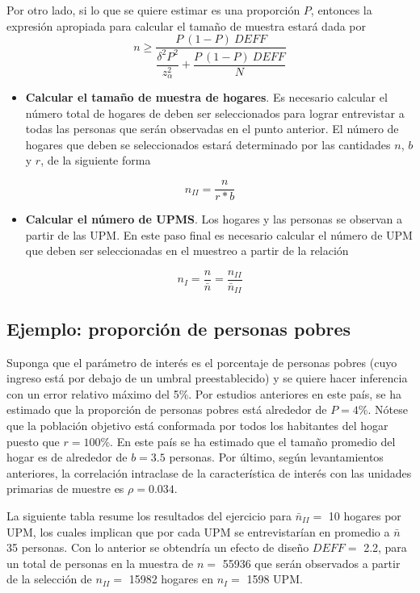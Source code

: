 Por otro lado, si lo que se quiere estimar es una proporción \(P\), entonces la expresión apropiada para calcular el tamaño de muestra estará dada por
\[
n \geq \dfrac{P\ (1-P)\ DEFF}{\dfrac{\delta^2P^2}{z_{\alpha}^2 }+\dfrac{P\ (1-P) \ DEFF}{N}}
\]

\begin{itemize}
\tightlist
\item
  \textbf{Calcular el tamaño de muestra de hogares}. Es necesario calcular el número total de hogares de deben ser seleccionados para lograr entrevistar a todas las personas que serán observadas en el punto anterior. El número de hogares que deben se seleccionados estará determinado por las cantidades \(n\), \(b\) y \(r\), de la siguiente forma
\end{itemize}

\[
n_{II} = \dfrac{n}{r * b}
\]

\begin{itemize}
\tightlist
\item
  \textbf{Calcular el número de UPMS}. Los hogares y las personas se observan a partir de las UPM. En este paso final es necesario calcular el número de UPM que deben ser seleccionadas en el muestreo a partir de la relación
\end{itemize}

\[
n_{I} = \frac{n}{\bar{n}} 
= \frac{n_{II}}{\bar{n}_{II}}
\]

\hypertarget{ejemplo-proporcion-de-personas-pobres}{%
\subsection*{Ejemplo: proporción de personas pobres}\label{ejemplo-proporcion-de-personas-pobres}}


Suponga que el parámetro de interés es el porcentaje de personas pobres (cuyo ingreso está por debajo de un umbral preestablecido) y se quiere hacer inferencia con un error relativo máximo del 5\%. Por estudios anteriores en este país, se ha estimado que la proporción de personas pobres está alrededor de \(P = 4\)\%. Nótese que la población objetivo está conformada por todos los habitantes del hogar puesto que \(r = 100\)\%. En este país se ha estimado que el tamaño promedio del hogar es de alrededor de \(b = 3.5\) personas. Por último, según levantamientos anteriores, la correlación intraclase de la característica de interés con las unidades primarias de muestre es \(\rho = 0.034\).

La siguiente tabla resume los resultados del ejercicio para \(\bar{n}_{II} =\) 10 hogares por UPM, los cuales implican que por cada UPM se entrevistarían en promedio a \(\bar{n}\) 35 personas. Con lo anterior se obtendría un efecto de diseño \(DEFF =\) 2.2, para un total de personas en la muestra de \(n =\) 55936 que serán observados a partir de la selección de \(n_{II} =\) 15982 hogares en \(n_{I} =\) 1598 UPM.

